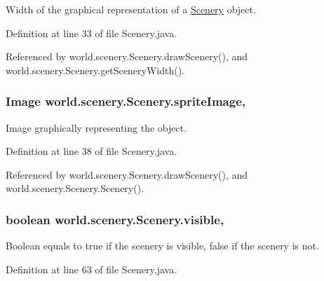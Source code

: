 Width of the graphical representation of a \hyperlink{classworld_1_1scenery_1_1_scenery}{Scenery} object. 



Definition at line 33 of file Scenery.\-java.



Referenced by world.\-scenery.\-Scenery.\-draw\-Scenery(), and world.\-scenery.\-Scenery.\-get\-Scenery\-Width().

\hypertarget{classworld_1_1scenery_1_1_scenery_a512d9c0a154e6843389e343d80843326}{
\subsubsection[{sprite\-Image}]{\setlength{\rightskip}{0pt plus 5cm}Image world.\-scenery.\-Scenery.\-sprite\-Image\hspace{0.3cm}{\ttfamily [protected]}, {\ttfamily [inherited]}}}\label{classworld_1_1scenery_1_1_scenery_a512d9c0a154e6843389e343d80843326}


Image graphically representing the object. 



Definition at line 38 of file Scenery.\-java.



Referenced by world.\-scenery.\-Scenery.\-draw\-Scenery(), and world.\-scenery.\-Scenery.\-Scenery().

\hypertarget{classworld_1_1scenery_1_1_scenery_a7b22a78d3126c947b7010fdbbea02218}{
\subsubsection[{visible}]{\setlength{\rightskip}{0pt plus 5cm}boolean world.\-scenery.\-Scenery.\-visible\hspace{0.3cm}{\ttfamily [protected]}, {\ttfamily [inherited]}}}\label{classworld_1_1scenery_1_1_scenery_a7b22a78d3126c947b7010fdbbea02218}


Boolean equals to true if the scenery is visible, false if the scenery is not. 



Definition at line 63 of file Scenery.\-java.



